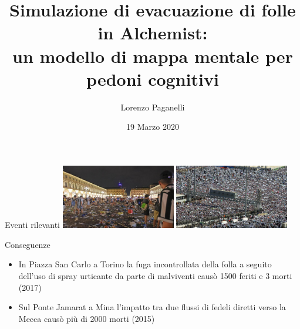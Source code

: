 \documentclass{beamer}
\title[Navigazione cognitiva in Alchemist]{
    Simulazione di evacuazione di folle in Alchemist: \\
    un modello di mappa mentale per pedoni cognitivi
}
\author{Lorenzo Paganelli}
\institute[]
{
    Alma Mater Studiorum $\cdot$ Università di Bologna\\
    Campus di Cesena%
}
\date{19 Marzo 2020}
\begin{document}
\begin{frame}
  \titlepage
\end{frame}



\begin{frame}{Eventi rilevanti}
\hfil\hfil\includegraphics[width=5cm]{figures/piazza-san-carlo.jpeg}
\hfil\hfil\includegraphics[width=5cm]{figures/hajj.jpg}
\newline
\null
\hfil\hfil{}
\hfil\hfil{}

\begin{block}{Conseguenze}
\begin{itemize}
    \item In Piazza San Carlo a Torino la fuga incontrollata della folla a seguito dell'uso di spray urticante da parte di malviventi causò 1500 feriti e 3 morti (2017)
    \item Sul Ponte Jamarat a Mina l'impatto tra due flussi di fedeli diretti verso la Mecca causò più di 2000 morti (2015)
\end{itemize}
\end{block}
\end{frame}
\end{document}

